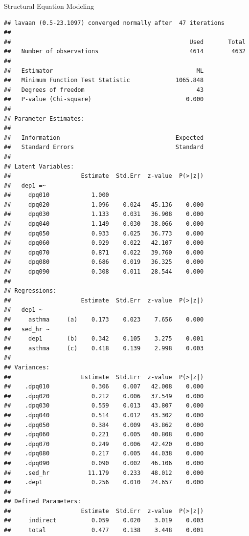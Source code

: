 \begin{frame}[fragile]{Structural Equation Modeling}

\tiny

\begin{verbatim}
## lavaan (0.5-23.1097) converged normally after  47 iterations
## 
##                                                   Used       Total
##   Number of observations                          4614        4632
## 
##   Estimator                                         ML
##   Minimum Function Test Statistic             1065.848
##   Degrees of freedom                                43
##   P-value (Chi-square)                           0.000
## 
## Parameter Estimates:
## 
##   Information                                 Expected
##   Standard Errors                             Standard
## 
## Latent Variables:
##                    Estimate  Std.Err  z-value  P(>|z|)
##   dep1 =~                                             
##     dpq010            1.000                           
##     dpq020            1.096    0.024   45.136    0.000
##     dpq030            1.133    0.031   36.908    0.000
##     dpq040            1.149    0.030   38.066    0.000
##     dpq050            0.933    0.025   36.773    0.000
##     dpq060            0.929    0.022   42.107    0.000
##     dpq070            0.871    0.022   39.760    0.000
##     dpq080            0.686    0.019   36.325    0.000
##     dpq090            0.308    0.011   28.544    0.000
## 
## Regressions:
##                    Estimate  Std.Err  z-value  P(>|z|)
##   dep1 ~                                              
##     asthma     (a)    0.173    0.023    7.656    0.000
##   sed_hr ~                                            
##     dep1       (b)    0.342    0.105    3.275    0.001
##     asthma     (c)    0.418    0.139    2.998    0.003
## 
## Variances:
##                    Estimate  Std.Err  z-value  P(>|z|)
##    .dpq010            0.306    0.007   42.008    0.000
##    .dpq020            0.212    0.006   37.549    0.000
##    .dpq030            0.559    0.013   43.807    0.000
##    .dpq040            0.514    0.012   43.302    0.000
##    .dpq050            0.384    0.009   43.862    0.000
##    .dpq060            0.221    0.005   40.808    0.000
##    .dpq070            0.249    0.006   42.420    0.000
##    .dpq080            0.217    0.005   44.038    0.000
##    .dpq090            0.090    0.002   46.106    0.000
##    .sed_hr           11.179    0.233   48.012    0.000
##    .dep1              0.256    0.010   24.657    0.000
## 
## Defined Parameters:
##                    Estimate  Std.Err  z-value  P(>|z|)
##     indirect          0.059    0.020    3.019    0.003
##     total             0.477    0.138    3.448    0.001
\end{verbatim}

\end{frame}

